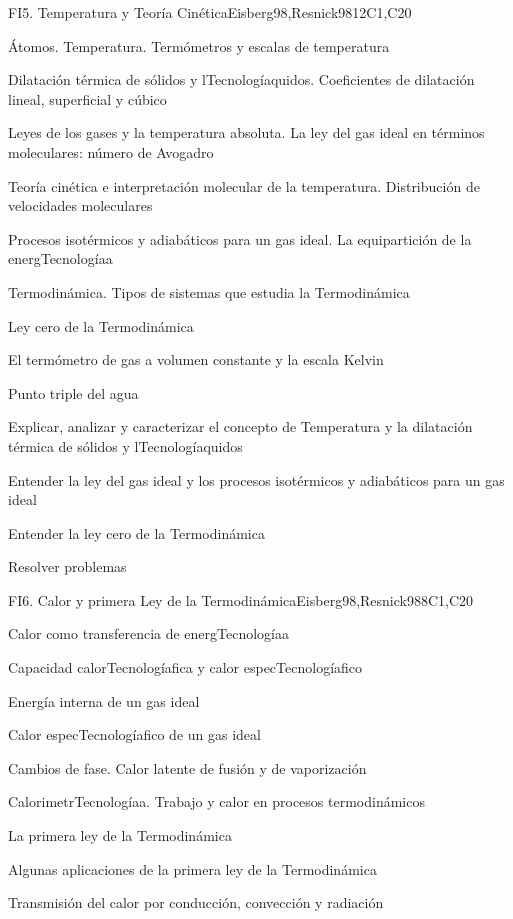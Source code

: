 \begin{syllabus}
\begin{unit}{FI5. Temperatura y Teoría Cinética}{Eisberg98,Resnick98}{}{12}{C1,C20}
\begin{topics}
         \item  Átomos. Temperatura. Termómetros y escalas de temperatura
	 \item  Dilatación térmica de sólidos y lTecnologíaquidos. Coeficientes de dilatación lineal, superficial y cúbico
         \item  Leyes de los gases y la temperatura absoluta. La ley del gas ideal en términos moleculares: número de Avogadro
	 \item  Teoría cinética e interpretación molecular de la temperatura. Distribución de velocidades moleculares
         \item  Procesos isotérmicos y adiabáticos para un gas ideal. La equipartición de la energTecnologíaa
	 \item  Termodinámica. Tipos de sistemas que estudia la Termodinámica
         \item  Ley cero de la Termodinámica
	 \item  El termómetro de gas a volumen constante y la escala Kelvin
         \item  Punto triple del agua
   \end{topics}

   \begin{learningoutcomes}
         \item  Explicar, analizar y caracterizar el concepto de Temperatura y la dilatación térmica de sólidos y lTecnologíaquidos
         \item  Entender la ley del gas ideal y los procesos isotérmicos y adiabáticos para un gas ideal
         \item  Entender la ley cero de la Termodinámica
         \item  Resolver problemas
   \end{learningoutcomes}
\end{unit}

\begin{unit}{FI6. Calor y primera Ley de la Termodinámica}{}{Eisberg98,Resnick98}{8}{C1,C20}
\begin{topics}
         \item  Calor como transferencia de energTecnologíaa
	 \item  Capacidad calorTecnologíafica y calor especTecnologíafico
         \item  Energía interna de un gas ideal
	 \item  Calor especTecnologíafico de un gas ideal
         \item  Cambios de fase. Calor latente de fusión y de vaporización
	 \item  CalorimetrTecnologíaa. Trabajo y calor en procesos termodinámicos
         \item  La primera ley de la Termodinámica
	 \item  Algunas aplicaciones de la primera ley de la Termodinámica
         \item  Transmisión del calor por conducción, convección y radiación
   \end{topics}


\end{unit}
\end{syllabus}

